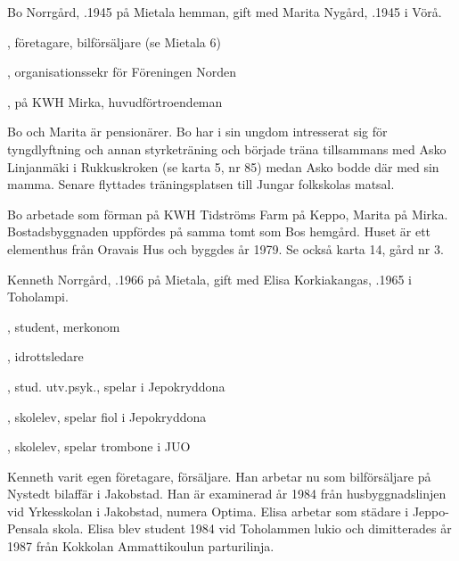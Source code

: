 Bo Norrgård, .1945  på Mietala hemman, gift med Marita Nygård, .1945 i Vörå.
\begin{jhchildren}
  \item {}, företagare, bilförsäljare (se Mietala 6)
  \item {}, organisationssekr för Föreningen Norden
  \item {}, på KWH Mirka, huvudförtroendeman
\end{jhchildren}
Bo och Marita är pensionärer. Bo har i sin ungdom intresserat sig för tyngdlyftning och annan styrketräning och började träna tillsammans med Asko Linjanmäki i Rukkuskroken (se karta 5, nr 85) medan Asko bodde där med sin mamma. Senare flyttades träningsplatsen till Jungar folkskolas matsal.

Bo arbetade som förman på KWH Tidströms Farm på Keppo, Marita på Mirka. Bostadsbyggnaden uppfördes på samma tomt som Bos hemgård. Huset är ett elementhus från Oravais Hus och byggdes år 1979. Se också karta 14, gård nr 3.




Kenneth Norrgård, .1966 på Mietala, gift med Elisa Korkiakangas, .1965 i Toholampi.
\begin{jhchildren}
  \item {}, student, merkonom
  \item {}, idrottsledare
  \item {}, stud. utv.psyk., spelar i Jepokryddona
  \item {}, skolelev, spelar fiol i Jepokryddona
  \item {}, skolelev, spelar trombone i JUO
\end{jhchildren}

Kenneth varit egen företagare, försäljare. Han arbetar nu som bilförsäljare på Nystedt bilaffär i Jakobstad. Han är examinerad år 1984 från husbyggnadslinjen vid Yrkesskolan i Jakobstad, numera Optima. Elisa arbetar som städare i Jeppo-Pensala skola. Elisa blev student 1984 vid Toholammen lukio och dimitterades år 1987 från Kokkolan Ammattikoulun parturilinja.

